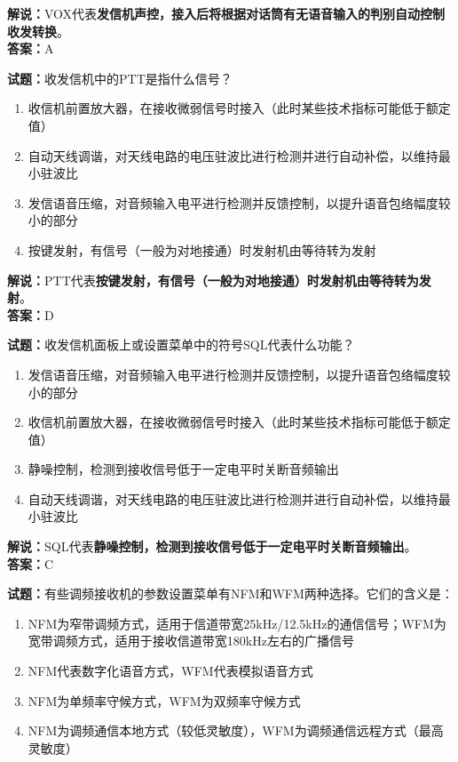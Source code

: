 \documentclass{ctexbook}
\begin{document}
\noindent\textbf{解说：}VOX代表\textbf{发信机声控，接入后将根据对话筒有无语音输入的判别自动控制收发转换}。\\\noindent\textbf{答案：}A


\bigskip


\noindent\textbf{试题：}收发信机中的PTT是指什么信号？

\begin{enumerate}[leftmargin=3em]
	\item 收信机前置放大器，在接收微弱信号时接入（此时某些技术指标可能低于额定值）
	\item 自动天线调谐，对天线电路的电压驻波比进行检测并进行自动补偿，以维持最小驻波比
	\item 发信语音压缩，对音频输入电平进行检测并反馈控制，以提升语音包络幅度较小的部分
	\item 按键发射，有信号（一般为对地接通）时发射机由等待转为发射
\end{enumerate}

\noindent\textbf{解说：}PTT代表\textbf{按键发射，有信号（一般为对地接通）时发射机由等待转为发射}。\\\noindent\textbf{答案：}D


\bigskip


\noindent\textbf{试题：}收发信机面板上或设置菜单中的符号SQL代表什么功能？

\begin{enumerate}[leftmargin=3em]
	\item 发信语音压缩，对音频输入电平进行检测并反馈控制，以提升语音包络幅度较小的部分
	\item 收信机前置放大器，在接收微弱信号时接入（此时某些技术指标可能低于额定值）
	\item 静噪控制，检测到接收信号低于一定电平时关断音频输出
	\item 自动天线调谐，对天线电路的电压驻波比进行检测并进行自动补偿，以维持最小驻波比
\end{enumerate}

\noindent\textbf{解说：}SQL代表\textbf{静噪控制，检测到接收信号低于一定电平时关断音频输出}。\\\noindent\textbf{答案：}C


\bigskip


\noindent\textbf{试题：}有些调频接收机的参数设置菜单有NFM和WFM两种选择。它们的含义是：

\begin{enumerate}[leftmargin=3em]
	\item NFM为窄带调频方式，适用于信道带宽25kHz/12.5kHz的通信信号；WFM为宽带调频方式，适用于接收信道带宽180kHz左右的广播信号
	\item NFM代表数字化语音方式，WFM代表模拟语音方式
	\item NFM为单频率守候方式，WFM为双频率守候方式
	\item NFM为调频通信本地方式（较低灵敏度），WFM为调频通信远程方式（最高灵敏度）
\end{enumerate}
\end{document}
